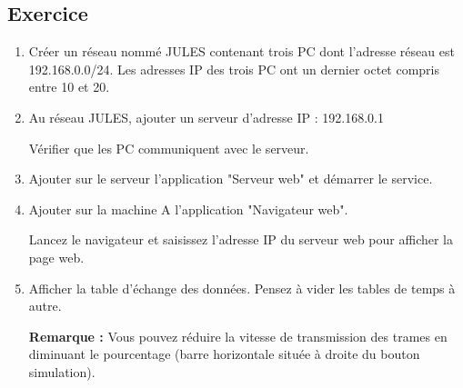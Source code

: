 \documentclass[11pt,a4paper]{article}
\newcounter{numexo}
\begin{document}
%
%


\addtocounter{numexo}{1}
\subsection*{\Large Exercice \thenumexo }
\begin{enumerate}
\item Créer un réseau nommé JULES contenant trois PC dont l'adresse réseau est 192.168.0.0/24. Les adresses IP des trois PC ont un dernier octet compris entre 10 et 20.
\item Au réseau JULES, ajouter un serveur d'adresse IP : 192.168.0.1

Vérifier que les PC communiquent avec le serveur.
\item Ajouter sur le serveur l'application "Serveur web" et démarrer le service.
\item Ajouter sur la machine A l'application "Navigateur web". 

Lancez le navigateur et saisissez l'adresse IP du serveur web pour afficher la page web.
\item Afficher la table d'échange des données. Pensez à vider les tables de temps à autre.

\textbf{Remarque :} Vous pouvez réduire la vitesse de transmission des trames en diminuant le pourcentage (barre horizontale située à droite du bouton simulation).
\end{enumerate}
\end{document}
